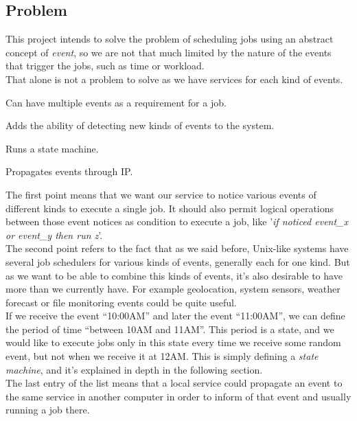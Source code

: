 \documentclass[a4paper,11pt]{article}
\begin{document}
\subsection{Problem}
This project intends to solve the problem of scheduling jobs using an abstract concept of \emph{event}, so we 
are not that much limited by the nature of the events that trigger the jobs, such as time or workload.\\
That alone is not a problem to solve as we have services for each kind of events.
\begin{list}{-}{But what we want is a service that:}
  \item Can have multiple events as a requirement for a job.
  \item Adds the ability of detecting new kinds of events to the system.
  \item Runs a state machine.
  \item Propagates events through IP.
\end{list}
The first point means that we want our service to notice various events of different kinds 
to execute a single job. It should also permit logical operations between those event notices
as condition to execute a job, like '\emph{if noticed event\_x or event\_y then run z}'.\\
The second point refers to the fact that as we said before, Unix-like systems have several
job schedulers for various kinds of events, generally each for one kind. But as we want to
be able to combine this kinds of events, it's also desirable to have more than we currently 
have. For example geolocation, system sensors, weather forecast or file monitoring events 
could be quite useful.\\
If we receive the event ``10:00AM'' and later the event ``11:00AM'', we can define the period of time 
``between 10AM and 11AM''. This period is a state, and we would like to execute jobs only in this state every 
time we receive some random event, but not when we receive it at 12AM. This is simply defining a 
\emph{state machine}, and it's explained in depth in the following section.\\
The last entry of the list means that a local service could propagate an event to the same service in another
computer in order to inform of that event and usually running a job there. 
\end{document}
